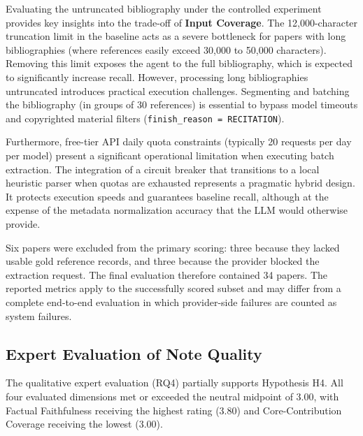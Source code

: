 \documentclass[runningheads]{llncs}
\begin{document}
Evaluating the untruncated bibliography under the controlled experiment provides key insights into the trade-off of \textbf{Input Coverage}. The 12,000-character truncation limit in the baseline acts as a severe bottleneck for papers with long bibliographies (where references easily exceed 30,000 to 50,000 characters). Removing this limit exposes the agent to the full bibliography, which is expected to significantly increase recall. However, processing long bibliographies untruncated introduces practical execution challenges. Segmenting and batching the bibliography (in groups of 30 references) is essential to bypass model timeouts and copyrighted material filters (\texttt{finish\_reason = RECITATION}). 

Furthermore, free-tier API daily quota constraints (typically 20 requests per day per model) present a significant operational limitation when executing batch extraction. The integration of a circuit breaker that transitions to a local heuristic parser when quotas are exhausted represents a pragmatic hybrid design. It protects execution speeds and guarantees baseline recall, although at the expense of the metadata normalization accuracy that the LLM would otherwise provide.

Six papers were excluded from the primary scoring: three because they lacked usable gold reference records, and three because the provider blocked the extraction request. The final evaluation therefore contained 34 papers. The reported metrics apply to the successfully scored subset and may differ from a complete end-to-end evaluation in which provider-side failures are counted as system failures.

\subsection{Expert Evaluation of Note Quality}
The qualitative expert evaluation (RQ4) partially supports Hypothesis H4. All four evaluated dimensions met or exceeded the neutral midpoint of 3.00, with Factual Faithfulness receiving the highest rating (3.80) and Core-Contribution Coverage receiving the lowest (3.00). 
\end{document}
